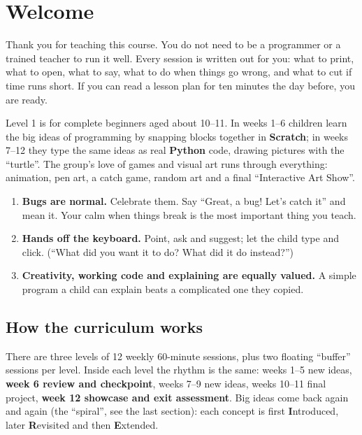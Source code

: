 \documentclass[level=1,teacher]{kidscode}
\begin{document}
\tableofcontents

\section{Welcome}
Thank you for teaching this course. You do not need to be a programmer or a trained teacher to run it
well. Every session is written out for you: what to print, what to open, what to say, what to do when
things go wrong, and what to cut if time runs short. If you can read a lesson plan for ten minutes the
day before, you are ready.

Level 1 is for complete beginners aged about 10--11. In weeks 1--6 children learn the big ideas of
programming by snapping blocks together in \textbf{Scratch}; in weeks 7--12 they type the same ideas as
real \textbf{Python} code, drawing pictures with the \enquote{turtle}. The group's love of games and
visual art runs through everything: animation, pen art, a catch game, random art and a final
\enquote{Interactive Art Show}.

\begin{teachernote}
\begin{enumerate}[itemsep=2pt]
  \item \textbf{Bugs are normal.} Celebrate them. Say \enquote{Great, a bug! Let's catch it} and mean it.
        Your calm when things break is the most important thing you teach.
  \item \textbf{Hands off the keyboard.} Point, ask and suggest; let the child type and click.
        (\enquote{What did you want it to do? What did it do instead?})
  \item \textbf{Creativity, working code and explaining are equally valued.} A simple program a child
        can explain beats a complicated one they copied.
\end{enumerate}
\end{teachernote}

\subsection{How the curriculum works}
There are three levels of 12 weekly 60-minute sessions, plus two floating \enquote{buffer} sessions per
level. Inside each level the rhythm is the same: weeks 1--5 new ideas, \textbf{week 6 review and
checkpoint}, weeks 7--9 new ideas, weeks 10--11 final project, \textbf{week 12 showcase and exit
assessment}. Big ideas come back again and again (the \enquote{spiral}, see the last section): each
concept is first \textbf{I}ntroduced, later \textbf{R}evisited and then \textbf{E}xtended.
\end{document}
